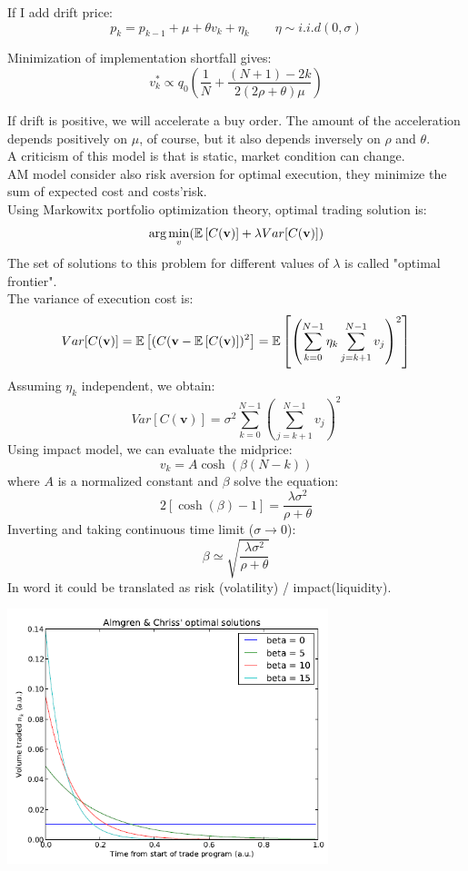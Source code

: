If I add drift price:
\[
p_k = p_{k-1} + \mu + \theta v_k + \eta_k \qquad \eta\sim i.i.d(0,\sigma)
\]
\newpage
\begin{mytheorem}
Minimization of implementation shortfall gives:
\[
v^*_k \propto q_0 \left(\frac{1}{N} + \frac{(N+1) - 2k}{2(2\rho + \theta)\mu}\right)
\]
\end{mytheorem}
If drift is positive, we will accelerate a buy order. The amount of the acceleration depends positively on $\mu$, of course, but it also depends inversely on $\rho$ and $\theta$.\\
A criticism of this model is that is static, market condition can change.\medskip \\
AM model consider also risk aversion for optimal execution, they minimize the sum of expected cost and costs'risk.\\
Using Markowitx portfolio optimization theory, optimal trading solution is:
\[
\text{arg}\min_v(\mathbb{E}\left[C(\textbf{v})\right] + \lambda Var[C(\textbf{v})])
\]
The set of solutions to this problem for different values of $\lambda$ is called "optimal frontier".\\
The variance of execution cost is:
\[
Var[C(\textbf{v})] = \mathbb{E}\left[(C(\textbf{v} - \mathbb{E}\left[C(\textbf{v})\right])^2\right] = \mathbb{E}\left[\left(\sum_{k =0}^{N-1} \eta_k \sum_{j=k+1}^{N-1} v_j\right)^2\right]
\]
Assuming $\eta_k$ independent, we obtain:
\[
Var[C(\textbf{v})] = \sigma^2 \sum_{k=0}^{N-1}\left(\sum_{j=k+1}^{N-1} v_j\right)^2
\]
Using impact model, we can evaluate the midprice:
\[
v_k = A \cosh(\beta (N-k))
\]
where $A$ is a normalized constant and $\beta$ solve the equation:
\[
2[\cosh(\beta) -1] = \frac{\lambda \sigma^2}{\rho + \theta}
\]
Inverting and taking continuous time limit ($\sigma \to 0$):
\[
\beta \simeq \sqrt{\frac{\lambda\sigma^2}{\rho + \theta}}
\]
In word it could be translated as risk (volatility) / impact(liquidity).
\begin{center}
	\includegraphics[width=0.7\textwidth]{picture/(7)AC_risk_averse.png}
\end{center}
